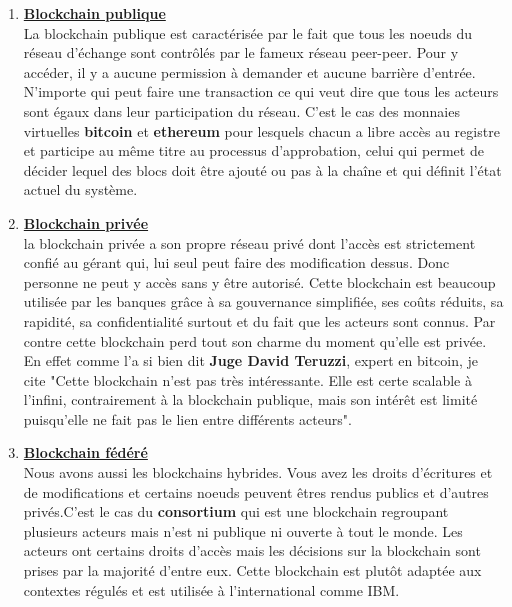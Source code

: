 \documentclass[12pt]{report}
\begin{document}
\begin{enumerate}

    \item \underline{\textbf{Blockchain publique}}\\ [0.3cm]
La blockchain publique est caractérisée par le fait que tous les noeuds du réseau d'échange sont contrôlés par le fameux réseau peer-peer. Pour y accéder, il y a aucune permission à demander et aucune barrière d'entrée. N'importe qui peut faire une transaction ce qui veut dire que tous les acteurs sont égaux dans leur participation du réseau. C'est le cas des monnaies virtuelles \textbf{bitcoin} et \textbf{ethereum} pour lesquels chacun a libre accès au registre et participe au même titre au processus d'approbation, celui qui permet de décider lequel des blocs doit être ajouté ou pas à la chaîne et qui définit l'état actuel du système.\\ 

\newpage
    \item \underline{\textbf{Blockchain privée}}\\[0.3cm]
la blockchain privée a son propre réseau privé dont l'accès est strictement confié au gérant qui, lui seul peut faire des modification dessus. Donc personne ne peut y accès sans y être autorisé. Cette blockchain est beaucoup utilisée par les banques grâce à sa gouvernance simplifiée, ses coûts réduits, sa rapidité, sa confidentialité surtout et du fait que les acteurs sont connus. Par contre cette blockchain perd tout son charme du moment qu'elle est privée. En effet comme l'a si bien dit \textbf{Juge David Teruzzi}, expert en bitcoin, je cite "Cette blockchain n'est pas très intéressante. Elle est certe scalable à l'infini, contrairement à la blockchain publique, mais son intérêt est limité puisqu'elle ne fait pas le lien entre différents acteurs". 

    \item \underline{\textbf{Blockchain fédéré}}\\[0.3cm]
Nous avons aussi les blockchains hybrides. Vous avez les droits d'écritures et de  modifications et certains noeuds peuvent êtres rendus publics et d'autres privés.C'est le cas du \textbf{consortium} qui est une blockchain regroupant plusieurs acteurs mais n'est ni publique ni ouverte à tout le monde. Les acteurs ont certains droits d'accès mais les décisions sur la blockchain sont prises par la majorité d'entre eux. Cette blockchain est plutôt adaptée aux contextes régulés et est utilisée à l'international comme IBM.\\

\end{enumerate}
\end{document}
